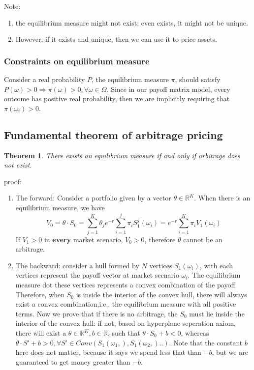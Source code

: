 \documentclass[a4paper,13pt]{report}
\newcommand{\R}{\mathbb{R}}
\newtheorem{theorem}{Theorem}[section]
\begin{document}
Note:
\begin{enumerate}
    \item the equilibrium measure might not exist; even exists, it might not be unique. 
    \item However, if it exists and unique, then we can use it to price assets. 
\end{enumerate}

\subsubsection{Constraints on equilibrium measure}
Consider a real probability $P$, the equilibrium measure $\pi$, should satisfy $P(\omega) > 0 \Rightarrow \pi(\omega) > 0, \forall \omega \in \Omega$. Since in our payoff matrix model, every outcome has positive real probability, then we are implicitly requiring that $\pi(\omega_i) > 0$. 

\subsection{Fundamental theorem of arbitrage pricing}
\begin{theorem}
There exists an equilibrium measure if and only if arbitrage does not exist. \cite{Lalley2001mathematical}
\end{theorem}
proof: 
\begin{enumerate}
    \item The forward: Consider a portfolio given by a vector $\theta \in \R^K$. When there is an equilibrium measure, we have
    $$V_0 = \theta \cdot S_0 = \sum_{j=1}^K \theta_j e^{-r}\sum_{i=1}^j \pi_i S_1^j (\omega_i) = e^{-r}\sum_{i=1}^K \pi_i V_1 (\omega_i)$$
    If $V_1 > 0$ in \textbf{every} market scenario, $V_0 >0$, therefore $\theta$ cannot be an arbitrage.
    \item The backward: consider a hull formed by $N$ vertices $S_1(\omega_i)$, with each vertices represent the payoff vector at market scenario $\omega_i$. The equilibrium measure dot these vertices represents a convex combination of the payoff. Therefore, when $S_0$ is inside the interior of the convex hull, there will always exist a convex combination,i.e., the equilibrium measure with all positive terms. Now we prove that if there is no arbitrage, the $S_0$ must lie inside the interior of the convex hull: if not, based on hyperplane seperation axiom, there will exist a $\theta \in \R^K, b\in \R$, such that $\theta \cdot S_0 + b< 0$, whereas $\theta \cdot S' + b> 0, \forall S' \in Conv(S_1(\omega_1,),S_1(\omega_2,)..)$. Note that the constant $b$ here does not matter, because it says we spend less that than $-b$, but we are guaranteed to get money greater than $-b$.
\end{enumerate}
\end{document}
